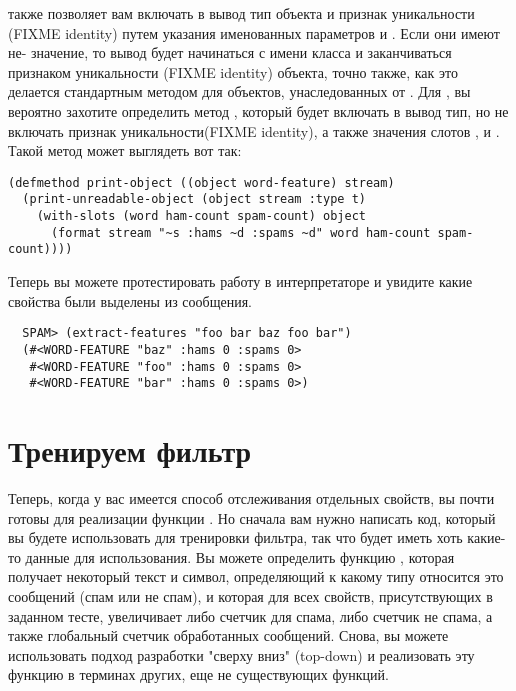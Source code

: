  также позволяет вам включать в вывод тип объекта и признак
уникальности (FIXME identity) путем указания именованных параметров  и
.  Если они имеют не- значение, то вывод будет начинаться с имени
класса и заканчиваться признаком уникальности (FIXME identity) объекта, точно также, как
это делается стандартным методом  для объектов, унаследованных от
.  Для , вы вероятно захотите определить метод
, который будет включать в вывод тип, но не включать признак
уникальности(FIXME identity), а также значения слотов ,  и
.  Такой метод может выглядеть вот так:

\begin{lstlisting}
(defmethod print-object ((object word-feature) stream)
  (print-unreadable-object (object stream :type t)
    (with-slots (word ham-count spam-count) object
      (format stream "~s :hams ~d :spams ~d" word ham-count spam-count))))
\end{lstlisting}

Теперь вы можете протестировать работу  в интерпретаторе и увидите
какие свойства были выделены из сообщения.

\begin{verbatim}
  SPAM> (extract-features "foo bar baz foo bar")
  (#<WORD-FEATURE "baz" :hams 0 :spams 0>
   #<WORD-FEATURE "foo" :hams 0 :spams 0>
   #<WORD-FEATURE "bar" :hams 0 :spams 0>)
\end{verbatim}

\section{Тренируем фильтр}

Теперь, когда у вас имеется способ отслеживания отдельных свойств, вы почти готовы для
реализации функции .  Но сначала вам нужно написать код, который вы будете
использовать для тренировки фильтра, так что  будет иметь хоть какие-то данные
для использования.  Вы можете определить функцию , которая получает некоторый
текст и символ, определяющий к какому типу относится это сообщений (спам или не спам), и
которая для всех свойств, присутствующих в заданном тесте, увеличивает либо счетчик для
спама, либо счетчик не спама, а также глобальный счетчик обработанных сообщений.  Снова,
вы можете использовать подход разработки "сверху вниз" (top-down) и реализовать эту
функцию в терминах других, еще не существующих функций.

